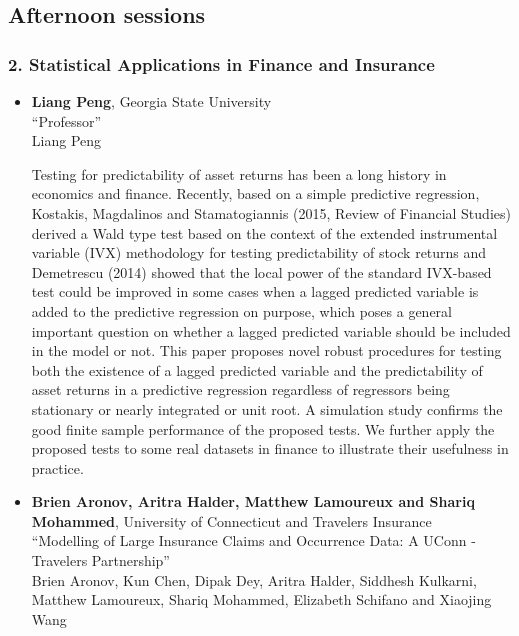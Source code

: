 \subsection*{Afternoon sessions}

\subsubsection*{2. Statistical Applications in Finance and Insurance}

\begin{itemize}
\item \textbf{Liang Peng}, Georgia State University \\
``Professor'' \\
Liang Peng


Testing for predictability of asset returns has been a long history in economics and finance. Recently, based on a simple predictive regression, Kostakis, Magdalinos and Stamatogiannis (2015,  Review of Financial Studies) derived a Wald type test based on the context of the extended instrumental variable (IVX) methodology for testing predictability of stock returns and Demetrescu (2014) showed that the local power of the standard IVX-based test could be improved in some cases when a lagged predicted variable is added to the predictive regression on purpose, which poses a general important question on whether a lagged predicted variable should be included in the model or not. This paper proposes novel robust   procedures for testing both the existence of a lagged predicted variable and the predictability of asset returns in a predictive regression regardless of regressors being stationary or nearly integrated or unit root. A simulation study confirms the good finite sample performance of the proposed tests. We further apply the proposed tests to some real datasets in finance to illustrate their usefulness in practice.

\item \textbf{Brien Aronov, Aritra Halder, Matthew Lamoureux and Shariq Mohammed}, University of Connecticut and Travelers Insurance \\
``Modelling of Large Insurance Claims and Occurrence Data: A UConn - Travelers Partnership'' \\
Brien Aronov, Kun Chen, Dipak Dey, Aritra Halder, Siddhesh Kulkarni, Matthew Lamoureux, Shariq Mohammed, Elizabeth Schifano and Xiaojing Wang



\end{itemize}
